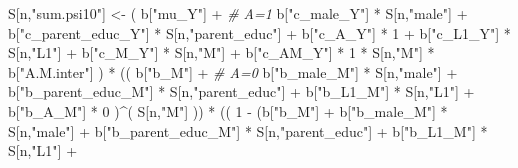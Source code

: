 \documentclass[
]{book}
\newenvironment{Shaded}{\begin{snugshade}}{\end{snugshade}}
\newcommand{\CommentTok}[1]{\textcolor[rgb]{0.56,0.35,0.01}{\textit{#1}}}
\newcommand{\DecValTok}[1]{\textcolor[rgb]{0.00,0.00,0.81}{#1}}
\newcommand{\NormalTok}[1]{#1}
\newcommand{\OtherTok}[1]{\textcolor[rgb]{0.56,0.35,0.01}{#1}}
\newcommand{\SpecialCharTok}[1]{\textcolor[rgb]{0.00,0.00,0.00}{#1}}
\newcommand{\StringTok}[1]{\textcolor[rgb]{0.31,0.60,0.02}{#1}}
\begin{document}
\begin{Shaded}
\begin{Highlighting}[]
\NormalTok{    S[n,}\StringTok{"sum.psi10"}\NormalTok{] }\OtherTok{\textless{}{-}}\NormalTok{  ( b[}\StringTok{"mu\_Y"}\NormalTok{] }\SpecialCharTok{+}                                          \CommentTok{\# A=1}
\NormalTok{                             b[}\StringTok{"c\_male\_Y"}\NormalTok{] }\SpecialCharTok{*}\NormalTok{ S[n,}\StringTok{"male"}\NormalTok{] }\SpecialCharTok{+} 
\NormalTok{                             b[}\StringTok{"c\_parent\_educ\_Y"}\NormalTok{] }\SpecialCharTok{*}\NormalTok{ S[n,}\StringTok{"parent\_educ"}\NormalTok{] }\SpecialCharTok{+} 
\NormalTok{                             b[}\StringTok{"c\_A\_Y"}\NormalTok{] }\SpecialCharTok{*} \DecValTok{1} \SpecialCharTok{+} 
\NormalTok{                             b[}\StringTok{"c\_L1\_Y"}\NormalTok{] }\SpecialCharTok{*}\NormalTok{ S[n,}\StringTok{"L1"}\NormalTok{] }\SpecialCharTok{+}
\NormalTok{                             b[}\StringTok{"c\_M\_Y"}\NormalTok{] }\SpecialCharTok{*}\NormalTok{ S[n,}\StringTok{"M"}\NormalTok{] }\SpecialCharTok{+}
\NormalTok{                             b[}\StringTok{"c\_AM\_Y"}\NormalTok{] }\SpecialCharTok{*} \DecValTok{1} \SpecialCharTok{*}\NormalTok{ S[n,}\StringTok{"M"}\NormalTok{] }\SpecialCharTok{*}\NormalTok{ b[}\StringTok{"A.M.inter"}\NormalTok{] ) }\SpecialCharTok{*}
\NormalTok{      (( b[}\StringTok{"b\_M"}\NormalTok{] }\SpecialCharTok{+}                                                             \CommentTok{\# A\textquotesingle{}=0}
\NormalTok{           b[}\StringTok{"b\_male\_M"}\NormalTok{] }\SpecialCharTok{*}\NormalTok{ S[n,}\StringTok{"male"}\NormalTok{] }\SpecialCharTok{+} 
\NormalTok{           b[}\StringTok{"b\_parent\_educ\_M"}\NormalTok{] }\SpecialCharTok{*}\NormalTok{ S[n,}\StringTok{"parent\_educ"}\NormalTok{] }\SpecialCharTok{+} 
\NormalTok{           b[}\StringTok{"b\_L1\_M"}\NormalTok{] }\SpecialCharTok{*}\NormalTok{ S[n,}\StringTok{"L1"}\NormalTok{] }\SpecialCharTok{+}
\NormalTok{           b[}\StringTok{"b\_A\_M"}\NormalTok{] }\SpecialCharTok{*} \DecValTok{0}\NormalTok{ )}\SpecialCharTok{\^{}}\NormalTok{( S[n,}\StringTok{"M"}\NormalTok{] )) }\SpecialCharTok{*}
\NormalTok{      (( }\DecValTok{1} \SpecialCharTok{{-}}\NormalTok{ (b[}\StringTok{"b\_M"}\NormalTok{] }\SpecialCharTok{+} 
\NormalTok{                b[}\StringTok{"b\_male\_M"}\NormalTok{] }\SpecialCharTok{*}\NormalTok{ S[n,}\StringTok{"male"}\NormalTok{] }\SpecialCharTok{+} 
\NormalTok{                b[}\StringTok{"b\_parent\_educ\_M"}\NormalTok{] }\SpecialCharTok{*}\NormalTok{ S[n,}\StringTok{"parent\_educ"}\NormalTok{] }\SpecialCharTok{+} 
\NormalTok{                b[}\StringTok{"b\_L1\_M"}\NormalTok{] }\SpecialCharTok{*}\NormalTok{ S[n,}\StringTok{"L1"}\NormalTok{] }\SpecialCharTok{+}

\end{Highlighting}
\end{Shaded}
\end{document}
